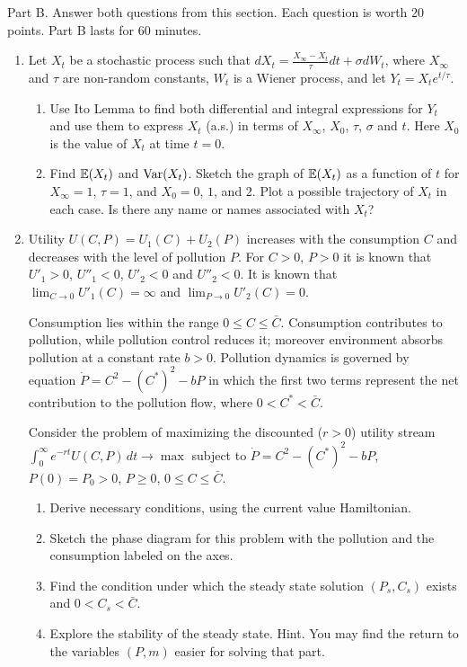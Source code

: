 \documentclass[pdftex,12pt,a4paper]{article}
\begin{document}
Part B.
Answer both questions from this section. Each question is worth 20 points.
Part B lasts for 60 minutes.
\begin{enumerate}
\item Let $X_t$ be a stochastic process such that
$dX_t=\frac{X_{\infty}-X_t}{\tau}dt+\sigma dW_t$, where $X_{\infty}$ and $\tau$ are non-random constants, $W_t$ is a Wiener process, and let $Y_t=X_t e^{t/\tau}$.
\begin{enumerate}
\item Use Ito Lemma to find both differential and integral expressions for $Y_t$ and use them to express $X_t$ (a.s.) in terms of $X_{\infty}$, $X_0$, $\tau$, $\sigma$ and $t$. Here $X_0$ is the value of $X_t$ at time $t=0$.
\item Find $\mathbb{E}(X_t)$ and $\operatorname{Var}(X_t)$. Sketch the graph of $\mathbb{E}(X_t)$ as a function of $t$ for $X_{\infty}=1$, $\tau=1$, and $X_0 = 0$, $1$, and $2$. Plot a possible trajectory of $X_t$ in each case. Is there any name or names associated with $X_t$? 
\end{enumerate}

\item Utility $U(C,P)=U_1(C)+U_2(P)$ increases with the consumption $C$ and decreases with the level of pollution $P$. For $C>0$, $P>0$ it is known that $U'_1>0$, $U''_1<0$, $U'_2<0$ and $U''_2<0$. It is known that $\lim_{C\to 0} U'_1(C)=\infty$ and $\lim_{P\to 0} U'_2(C)=0$. 

Consumption lies within the range $0\leq C\leq \bar{C}$. Consumption contributes to pollution, while pollution control reduces it; moreover environment absorbs pollution at a constant rate $b>0$.  Pollution dynamics is governed by equation $\dot{P}=C^2-(C^*)^2-bP$ in which the first two terms represent the net contribution to the pollution flow, where $0<C^*<\bar{C}$. 

Consider the problem of maximizing the discounted ($r>0$) utility stream  
$\int_0^{\infty}e^{-rt}U(C,P)\, dt \to \max$
subject to $\dot{P}=C^2-(C^*)^2-bP$, $P(0)=P_0>0$, $P\geq 0$, $0\leq C\leq \bar{C}$.
\begin{enumerate}
\item Derive necessary conditions, using the current value Hamiltonian.
\item Sketch the phase diagram for this problem with the pollution and the consumption labeled on the axes.
\item Find the condition under which the steady state solution $(P_s,C_s)$ exists and $0<C_s<\bar{C}$.
\item Explore the stability of the steady state. Hint. You may find the return to the variables $(P,m)$ easier for solving that part.
\end{enumerate}
\end{enumerate}
\end{document}
